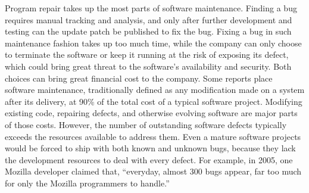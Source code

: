 Program repair takes up the most parts of software maintenance. Finding a bug requires manual tracking and analysis, and only after further development and testing can the update patch be published to fix the bug\cite{SCaMC}.
Fixing a bug in such maintenance fashion takes up too much time, while the company can only choose to terminate the software or keep it running at the risk of exposing its defect, which could bring great threat to the software's availability and security. Both choices can bring great financial cost to the company\cite{CMfFSLCP}.
Some reports place software maintenance, traditionally defined as any modification made on a system after its delivery, at 90\% of the total cost of a typical software project\cite{CMfFSLCP}.
Modifying existing code, repairing defects, and otherwise evolving software are major parts of those costs\cite{AiSE}.
However, the number of outstanding software defects typically exceeds the resources available to address them.
Even a mature software projects would be forced to ship with both known and unknown bugs, because they lack the development resources to deal with every defect. For example, in 2005, one Mozilla developer claimed that, “everyday, almost 300 bugs appear, far too much for only the Mozilla programmers to handle.”

